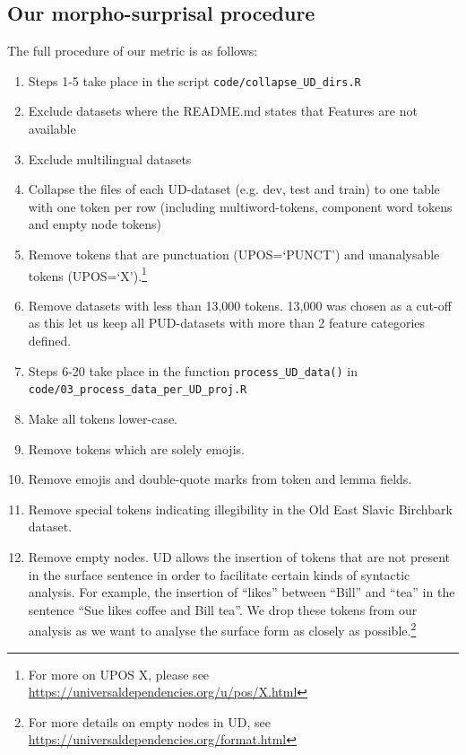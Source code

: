 \documentclass[USenglish]{article}
\begin{document}
\subsection{Our morpho-surprisal procedure}\label{sec:appendix_ours}
The full procedure of our metric is as follows:\\
\begin{enumerate}
  \item[] \hspace*{-\leftmargin} Steps 1-5 take place in the script \texttt{code/collapse\_UD\_dirs.R}
\item Exclude datasets where the README.md states that Features are not available
\item Exclude multilingual datasets
\item Collapse the files of each UD-dataset (e.g. dev, test and train) to one table with one token per row (including multiword-tokens, component word tokens and empty node tokens)
\item Remove tokens that are punctuation (UPOS=`PUNCT') and unanalysable tokens (UPOS=`X').\footnote{For more on UPOS X, please see \url{https://universaldependencies.org/u/pos/X.html}}
\item Remove datasets with less than 13,000 tokens. 13,000 was chosen as a cut-off as this let us keep all PUD-datasets with more than 2 feature categories defined.\\
 \item[] \hspace*{-\leftmargin}Steps 6-20 take place in the function \texttt{process\_UD\_data()} in \newline\texttt{code/03\_process\_data\_per\_UD\_proj.R}
 \item Make all tokens lower-case.
\item Remove tokens which are solely emojis.
\item Remove emojis and double-quote marks from token and lemma fields.
\item Remove special tokens indicating illegibility in the Old East Slavic Birchbark dataset.
\item Remove empty nodes. UD allows the insertion of tokens that are not present in the surface sentence in order to facilitate certain kinds of syntactic analysis. For example, the insertion of ``likes'' between ``Bill'' and ``tea'' in the sentence ``Sue likes coffee and Bill tea''. We drop these tokens from our analysis as we want to analyse the surface form as closely as possible.\footnote{For more details on empty nodes in UD, see \url{https://universaldependencies.org/format.html}}

\end{enumerate}
\end{document}
